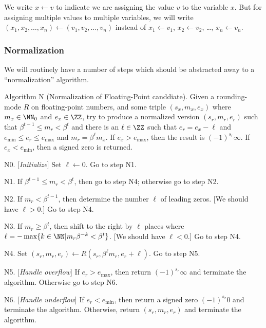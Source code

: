 \begin{notation}
  We write $x\gets v$ to indicate we are assigning the value $v$ to the
  variable $x$. But for assigning multiple values to multiple variables,
  we will write $(x_{1}, x_{2}, \dots, x_{n})\gets(v_{1},v_{2},\dots,v_{n})$
  instead of $x_{1}\gets v_{1}$, $x_{2}\gets v_{2}$, \dots, $x_{n}\gets v_{n}$.
\end{notation}

\subsubsection{Normalization}

We will routinely have a number of steps which should be abstracted away
to a ``normalization'' algorithm.

\algbegin Algorithm N (Normalization of Floating-Point canddiate). Given
a rounding-mode $R$ on floating-point numbers, and
some triple $(s_{x}, m_{x}, e_{x})$ where $m_{x}\in\NN_{0}$ and
$e_{x}\in\ZZ$, try to produce a normalized version $(s_{r}, m_{r}, e_{r})$
such that $\beta^{t-1}\leq m_{r}<\beta^{t}$ and there is an $\ell\in\ZZ$
such that $e_{r}=e_{x}-\ell$ and $e_{\text{min}}\leq e_{r}\leq e_{\text{max}}$
and $m_{r} = \beta^{\ell}m_{x}$. If $e_{x}> e_{\text{max}}$, then the
result is $(-1)^{s_{r}}\infty$. If $e_{x} < e_{\text{min}}$, then a
signed zero is returned.

\algstep N0. [{\it Initialize\/}] Set $\ell\gets0$. Go to step N1.

\algstep N1. If $\beta^{t-1}\leq m_{r}<\beta^{t}$, then go to step N4;
otherwise go to step N2.

\algstep N2. If $m_{r} < \beta^{t-1}$, then determine the number $\ell$
of leading zeros. [We should have $\ell>0$.] Go to step N4.

\algstep N3. If $m_{r} \geq \beta^{t}$, then shift to the right by
$\ell$ places where $\ell = -\max\{k\in\NN | m_{r}\beta^{-k}<\beta^{t}\}$.
[We should have $\ell < 0$.]
Go to step N4.

\algstep N4. Set $(s_{r},m_{r},e_{r})\gets R(s_{r},\beta^{\ell}m_{r},e_{r}+\ell)$.
Go to step N5.

\algstep N5. [{\it Handle overflow\/}] If $e_{r}>e_{\text{max}}$, then
return $(-1)^{s_{r}}\infty$ and terminate the algorithm. Otherwise go to
step N6.

\algstep N6. [{\it Handle underflow\/}] If $e_{r}<e_{\text{min}}$, then
return a signed zero $(-1)^{s_{r}}0$ and terminate the
algorithm. Otherwise, return $(s_{r},m_{r},e_{r})$ and terminate the algorithm.\quad\slug

